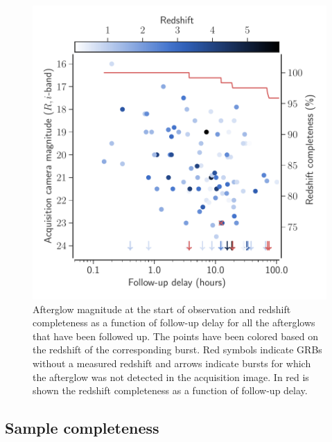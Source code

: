 \documentclass[longauth]{aa}    %
\begin{document}
\begin{figure}[!ht]
	\centerline{\includegraphics[width=\columnwidth]{figures/timing.pdf}} \caption{Afterglow
	magnitude at the start of observation and redshift completeness as a function
	of follow-up delay for all the afterglows that have been followed up. The
	points have been colored based on the redshift of the corresponding burst. Red
	symbols indicate GRBs without a measured redshift and arrows indicate bursts
	for which the afterglow was not detected in the acquisition image. In red is
	shown the redshift completeness as a function of follow-up delay.}
\label{fig:timing}
\end{figure}

\subsection{Sample completeness} \label{completeness}
\end{document}
